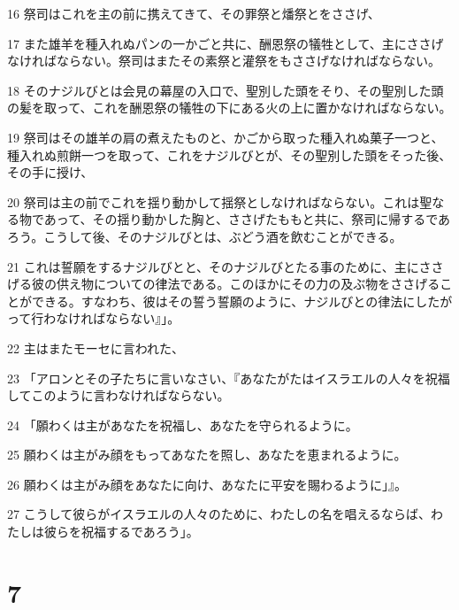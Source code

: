 \par 16 祭司はこれを主の前に携えてきて、その罪祭と燔祭とをささげ、
\par 17 また雄羊を種入れぬパンの一かごと共に、酬恩祭の犠牲として、主にささげなければならない。祭司はまたその素祭と灌祭をもささげなければならない。
\par 18 そのナジルびとは会見の幕屋の入口で、聖別した頭をそり、その聖別した頭の髪を取って、これを酬恩祭の犠牲の下にある火の上に置かなければならない。
\par 19 祭司はその雄羊の肩の煮えたものと、かごから取った種入れぬ菓子一つと、種入れぬ煎餅一つを取って、これをナジルびとが、その聖別した頭をそった後、その手に授け、
\par 20 祭司は主の前でこれを揺り動かして揺祭としなければならない。これは聖なる物であって、その揺り動かした胸と、ささげたももと共に、祭司に帰するであろう。こうして後、そのナジルびとは、ぶどう酒を飲むことができる。
\par 21 これは誓願をするナジルびとと、そのナジルびとたる事のために、主にささげる彼の供え物についての律法である。このほかにその力の及ぶ物をささげることができる。すなわち、彼はその誓う誓願のように、ナジルびとの律法にしたがって行わなければならない』」。
\par 22 主はまたモーセに言われた、
\par 23 「アロンとその子たちに言いなさい、『あなたがたはイスラエルの人々を祝福してこのように言わなければならない。
\par 24 「願わくは主があなたを祝福し、あなたを守られるように。
\par 25 願わくは主がみ顔をもってあなたを照し、あなたを恵まれるように。
\par 26 願わくは主がみ顔をあなたに向け、あなたに平安を賜わるように」』。
\par 27 こうして彼らがイスラエルの人々のために、わたしの名を唱えるならば、わたしは彼らを祝福するであろう」。

\chapter{7}


